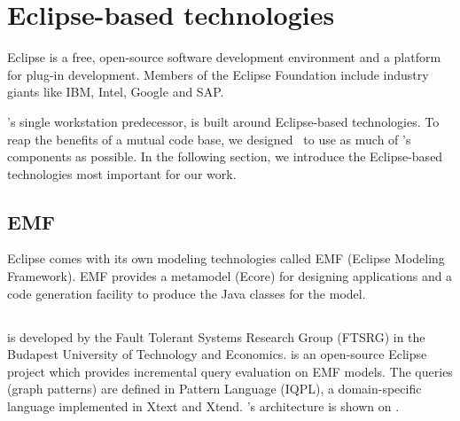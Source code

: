 
\section{Eclipse-based technologies}

Eclipse is a free, open-source software development environment and a platform for plug-in development. Members of the Eclipse Foundation include industry giants like IBM, Intel, Google and SAP.

\iqd{}'s single workstation predecessor, \eiq{} is built around Eclipse-based technologies. To reap the benefits of a mutual code base, we designed \iqd\ to use as much of \eiq's components as possible. In the following section, we introduce the Eclipse-based technologies most important for our work.

\subsection{EMF}
\label{subsec:EMF}

Eclipse comes with its own modeling technologies called EMF (Eclipse Modeling Framework). EMF provides a metamodel (Ecore) for designing applications and a code generation facility to produce the Java classes for the model.

\subsection{\eiq{}}
\label{subsec:eiq}

\eiq{} is developed by the Fault Tolerant Systems Research Group (FTSRG) in the Budapest University of Technology and Economics. \eiq{} is an open-source Eclipse project which provides incremental query evaluation on EMF models. The queries (graph patterns) are defined in \iq{} Pattern Language (IQPL), a domain-specific language implemented in Xtext and Xtend. \eiq{}'s architecture is shown on .


